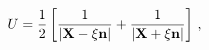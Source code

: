 \begin{equation}
 U =  
{1\over2}\left[{1\over |{\bf X}- \xi{\bf n}|} + 
 {1\over |{\bf X}+ \xi{\bf n}|}\right]\, ,
 \label{eq:harmonic_func}
\end{equation}

